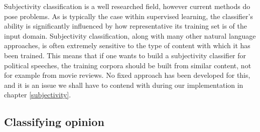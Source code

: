 Subjectivity classification is a well researched field, however current methods do pose problems. As is typically the case within supervised learning, the classifier's ability is significantly influenced by how representative its training set is of the input domain. Subjectivity classification, along with many other natural language approaches, is often extremely sensitive to the type of content with which it has been trained. This means that if one wants to build a subjectivity classifier for political speeches, the training corpora should be built from similar content, not for example from movie reviews. No fixed approach has been developed for this, and it is an issue we shall have to contend with during our implementation in chapter \ref{subjectivity}. 

\begin{comment}
	
Subjectivity word-sense disambiguation \cite{Akkaya:2009ww}

- typical approaches rely on lexicon of words
	- these are usually word lists rather than meanings (or senses)
	- can lead to false hits i.e. word assumed to imply s, when really it is o
- thus Subjectivity Word Sense Disambiguation
	- labels clue words as subjective or objective sense
	- more feasible than full word-sense
- use SVM
- use bootstrapping to create a training set

- since sentences often contain multiple subjective expressions, expression level classification is more informative than sentence-level classification

Word sense and subjectivity \cite{Wiebe:2006te}
- propose that there are motivations for separate classifiers, one each
- top of page 6 makes very good point about a word typically being subjective, being objective in a subjective sentence

Learning subjective adjectives from a corpora \cite{Wiebe:2000ub}

Effects of adjective orientation \cite{Wiebe:2000tk}
- use word conjunctions to find positive/negative adjectives
	- e.g. would say corrupt and brutal, not corrup or brutal

\end{comment}


\subsection{Classifying opinion}
\label{background:sentiment_classification}

